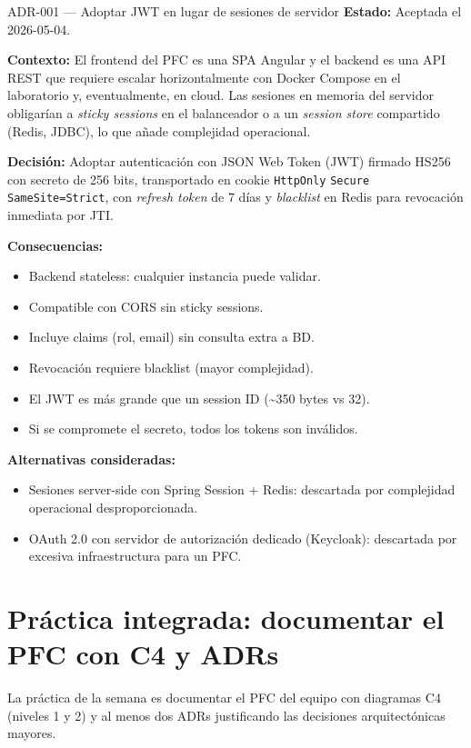 \begin{cajaadr}{ADR-001 --- Adoptar JWT en lugar de sesiones de servidor}
\textbf{Estado:} Aceptada el 2026-05-04.

\textbf{Contexto:} El frontend del PFC es una SPA Angular y el
backend es una API REST que requiere escalar horizontalmente con
Docker Compose en el laboratorio y, eventualmente, en cloud. Las
sesiones en memoria del servidor obligarían a \emph{sticky sessions}
en el balanceador o a un \emph{session store} compartido (Redis,
JDBC), lo que añade complejidad operacional.

\textbf{Decisión:} Adoptar autenticación con JSON Web Token (JWT)
firmado HS256 con secreto de 256 bits, transportado en cookie
\texttt{HttpOnly} \texttt{Secure} \texttt{SameSite=Strict}, con
\emph{refresh token} de 7 días y \emph{blacklist} en Redis para
revocación inmediata por JTI.

\textbf{Consecuencias:}
\begin{itemize}
\item[(+)] Backend stateless: cualquier instancia puede validar.
\item[(+)] Compatible con CORS sin sticky sessions.
\item[(+)] Incluye claims (rol, email) sin consulta extra a BD.
\item[(--)] Revocación requiere blacklist (mayor complejidad).
\item[(--)] El JWT es más grande que un session ID (\textasciitilde 350 bytes vs 32).
\item[(--)] Si se compromete el secreto, todos los tokens son
inválidos.
\end{itemize}

\textbf{Alternativas consideradas:}
\begin{itemize}
\item Sesiones server-side con Spring Session + Redis: descartada
por complejidad operacional desproporcionada.
\item OAuth 2.0 con servidor de autorización dedicado (Keycloak):
descartada por excesiva infraestructura para un PFC.
\end{itemize}
\end{cajaadr}

\section{Práctica integrada: documentar el PFC con C4 y ADRs}

La práctica de la semana es documentar el PFC del equipo con
diagramas C4 (niveles 1 y 2) y al menos dos ADRs justificando las
decisiones arquitectónicas mayores.


